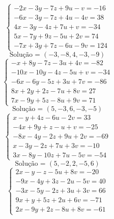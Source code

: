 \documentclass[12pt,oneside,a4paper,fleqn]{article}
\begin{document}
\begin{multicols*}{2}
\begin{equation*}
\begin{cases}
-2x-3y-7z+9u-v=-16 \\
-6x-3y-7z+4u-4v=38 \\
4x-3y-4z+7u+v=-34 \\
5x-7y+9z-5u+2v=74 \\
-7x+3y+7z-6u-9v=124
\end{cases}
\end{equation*}
\begin{equation*}
\text{Solução = }\left(-3,-8,4,-3,-9\right)
\end{equation*}
\vspace{\baselineskip}
\begin{equation*}
\begin{cases}
-x+8y-7z-3u+4v=-82 \\
-10x-10y-4z-5u+v=-34 \\
-6x-6y-5z+3u+7v=-86 \\
8x+2y+2z-7u+8v=27 \\
7x-9y+5z-8u+9v=71
\end{cases}
\end{equation*}
\begin{equation*}
\text{Solução = }\left(5,-3,6,-3,-5\right)
\end{equation*}
\vspace{\baselineskip}
\begin{equation*}
\begin{cases}
x-y+4z-6u-2v=33 \\
-4x+9y+z-u+v=-25 \\
-8x-4y-2z+9u+2v=-69 \\
x-3y-2z+7u+3v=-10 \\
3x-8y-10z+7u-5v=-54
\end{cases}
\end{equation*}
\begin{equation*}
\text{Solução = }\left(5,-2,2,-5,6\right)
\end{equation*}
\vspace{\baselineskip}
\begin{equation*}
\begin{cases}
2x-y-z-5u+8v=-20 \\
-9x-4y+3z-2u-5v=40 \\
-3x-5y-2z+3u+3v=66 \\
9x+y+5z+2u+6v=-71 \\
2x-9y+2z-8u+8v=-61
\end{cases}
\end{equation*}

\end{multicols*}
\end{document}
